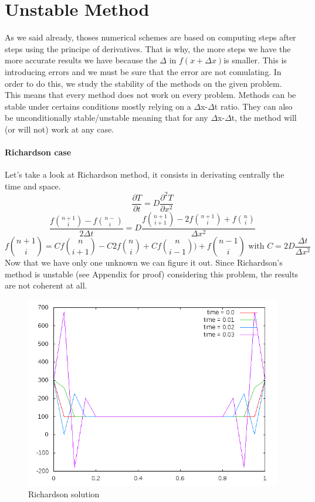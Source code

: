 \documentclass[12pt, a4paper]{report}
\begin{document}
\section{Unstable Method}
As we said already, thoses numerical schemes are based on computing steps after steps using the principe of derivatives. That is why, the more steps we have the more accurate results we have because the $\Delta$ in $f(x+\Delta x)$is smaller. This is introducing errors and we must be sure that the error are not comulating. In order to do this, we study the stability of the methods on the given problem. This means that every method does not work on every problem. Methods can be stable under certains conditions mostly relying on a $\Delta$x-$\Delta$t ratio. They can also be unconditionally stable/unstable meaning that for any $\Delta$x-$\Delta$t, the method will (or will not) work at any case.
\paragraph{Richardson case}
Let's take a look at Richardson method, it consists in derivating centrally the time and space.
\begin{equation}\frac{\partial T}{\partial t} = D\frac{\partial^2T }{\partial x^2}
\end{equation} 
\begin{equation}\frac{f\binom{n+1}{i} - f\binom{n-}{i}}{2\Delta t} = D\frac{f\binom{n+1}{i+1} - 2f\binom{n+1}{i}+ f\binom{n}{i}}{\Delta x^{2}}
\end{equation} 
\begin{equation}f\binom{n+1}{i} = Cf\binom{n}{i+1} - C2f\binom{n}{i}+ Cf\binom{n}{i-1})+f\binom{n-1}{i} \text{ with }
C = 2D\frac{\Delta t}{\Delta x^{2}}
\end{equation} 
Now that we have only one unknown we can figure it out. Since Richardson's method is unstable (see Appendix for proof) considering this problem, the results are not coherent at all.\\
\begin{figure}[h]
\centering
\includegraphics[scale=0.6]{Richardson.png}
\caption{Richardson solution}
\end{figure}
\end{document}
